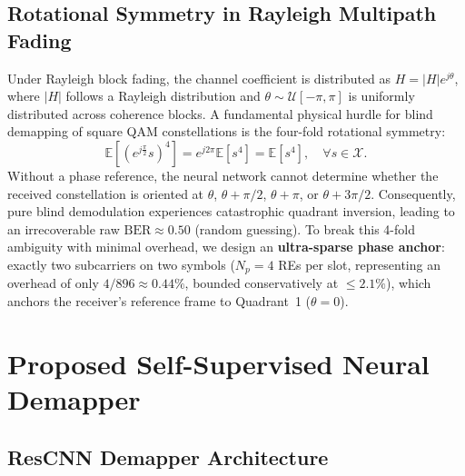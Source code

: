 ﻿\documentclass[journal,twoside]{IEEEtran}
\begin{document}
\subsection{Rotational Symmetry in Rayleigh Multipath Fading}

Under Rayleigh block fading, the channel coefficient is distributed as
$H = |H| e^{j\theta}$, where $|H|$ follows a Rayleigh distribution and
$\theta \sim \mathcal{U}[-\pi, \pi]$ is uniformly distributed across coherence blocks.
A fundamental physical hurdle for blind demapping of square QAM constellations is the
four-fold rotational symmetry:
\begin{equation}\label{eq:rot_symmetry}
  \mathbb{E}\left[\left(e^{j \frac{\pi}{2}} s\right)^4\right] = e^{j 2\pi} \mathbb{E}[s^4] = \mathbb{E}[s^4], \quad \forall s \in \mathcal{X}.
\end{equation}
Without a phase reference, the neural network cannot determine whether the received
constellation is oriented at $\theta$, $\theta + \pi/2$, $\theta + \pi$, or $\theta + 3\pi/2$.
Consequently, pure blind demodulation experiences catastrophic quadrant inversion,
leading to an irrecoverable raw $\text{BER} \approx 0.50$ (random guessing).
To break this 4-fold ambiguity with minimal overhead, we design an \textbf{ultra-sparse phase anchor}:
exactly two subcarriers on two symbols ($N_p = 4$ REs per slot, representing an overhead of
only $4 / 896 \approx 0.44\%$, bounded conservatively at $\leq 2.1\%$), which anchors the
receiver's reference frame to Quadrant~1 ($\theta = 0$).

\section{Proposed Self-Supervised Neural Demapper}\label{sec:proposed}

\subsection{ResCNN Demapper Architecture}
\end{document}
